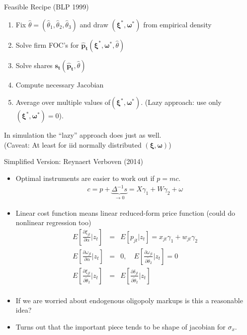 \documentclass[aspectratio=169,11pt]{beamer}
\begin{document}
\begin{frame}{Feasible Recipe (BLP 1999)}
\begin{enumerate}
\item Fix $\widehat{\theta}=(\widehat{\theta}_1,\widehat{\theta}_2,\widehat{\theta}_3)$ and draw $(\symbf{\xi}^{*},\symbf{\omega}^{*})$ from empirical density
\item Solve firm FOC's for $\symbf{\hat{p}_{t}}(\symbf{\xi}^{*},\symbf{\omega}^{*},\widehat{\theta})$
\item Solve shares $\symbf{s_{t}}(\symbf{\hat{p}_{t}},\widehat{\theta})$
\item Compute necessary Jacobian
\item Average over multiple values of$(\symbf{\xi}^{*},\symbf{\omega}^{*})$. (Lazy approach: use only $(\symbf{\xi}^{*},\symbf{\omega}^{*})=0$).
\end{enumerate}
In simulation the ``lazy'' approach does just as well.\\
 (Caveat: At least for iid normally distributed $(\symbf{\xi},\symbf{\omega})$)
\end{frame}



\begin{frame}{Simplified Version: Reynaert Verboven (2014)}
\begin{itemize}
\footnotesize
\item Optimal instruments are easier to work out if $p = mc$.
\begin{eqnarray*}
c = p  + \underbrace{\Delta^{-1} s}_{\rightarrow 0}  = X \gamma_1 + W \gamma_2 + \omega
\end{eqnarray*}
\item Linear cost function means linear reduced-form price function (could do nonlinear regression too)
\begin{eqnarray*}
E\left[ \frac{\partial \xi_{jt} }{\partial \alpha} | z_t \right] &=& E[p_{jt} | z_t] = x_{jt} \gamma_1 + w_{jt} \gamma_2\\
E\left[ \frac{\partial \omega_{jt} }{\partial \alpha} | z_t \right] &=& 0 , \quad E\left[ \frac{\partial \omega_{jt} }{\partial \widetilde{\theta}_2} | z_t \right] = 0\\
E\left[ \frac{\partial \xi_{jt} }{\partial \widetilde{\theta}_2} | z_t \right] &=&E\left[ \frac{\partial \delta_{jt} }{\partial \widetilde{\theta}_2} | z_t \right]\\
\end{eqnarray*}
\item If we are worried about endogenous oligopoly markups is this a reasonable idea?
\item Turns out that the important piece tends to be \alert{shape} of jacobian for $\sigma_x$.
\end{itemize}
\end{frame}
\end{document}
